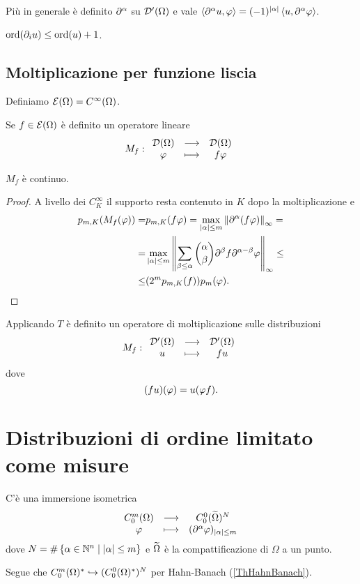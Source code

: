 \begin{remark}
Pi\`u in generale \`e definito $\partial^\alpha$ su $\mathcal{D}'(\Omega)$ e vale $\left\langle {\partial^\alpha u,\varphi}\right\rangle=(-1)^{\left|{\alpha}\right|}\left\langle {u,\partial^\alpha\varphi}\right\rangle$.
\end{remark}



\begin{remark}
$\operatorname{ord}(\partial_i u)\leq\operatorname{ord}(u)+1$.
\end{remark}



\subsection{Moltiplicazione per funzione liscia}
\begin{notation}
Definiamo $\mathcal{E}(\Omega)=C^\infty(\Omega)$.
\end{notation}

\begin{remark}
Se $f\in \mathcal{E}(\Omega)$ \`e definito un operatore lineare
\[M_f:\begin{array}{ccc} {\mathcal{D}(\Omega)} & \longrightarrow & {\mathcal{D}(\Omega)}\\ {\varphi} & \longmapsto & {f\varphi} \end{array}\]
\end{remark}

\begin{remark}
$M_f$ \`e continuo.
\end{remark}
\begin{proof}
A livello dei $C^\infty_K$ il supporto resta contenuto in $K$ dopo la moltiplicazione e
\begin{align*}
    p_{m,K}(M_f(\varphi))=&p_{m,K}(f\varphi)=\max_{\left|{\alpha}\right|\leq m}\left\Vert{\partial^\alpha(f\varphi)}\right\Vert_\infty=\\
    =&\max_{\left|{\alpha}\right|\leq m}\left\Vert{\sum_{\beta\leq \alpha}\binom{\alpha}\beta\partial^\beta f\partial^{\alpha-\beta}\varphi}\right\Vert_\infty\leq\\
    \leq& (2^m p_{m,K}(f))p_m(\varphi).
\end{align*}
\end{proof}

\begin{remark}
Applicando $T$ \`e definito un operatore di moltiplicazione sulle distribuzioni
\[M_f:\begin{array}{ccc} {\mathcal{D}'(\Omega)} & \longrightarrow & {\mathcal{D}'(\Omega)}\\ {u} & \longmapsto & {fu} \end{array}\]
dove
\[(fu)(\varphi)=u(\varphi f).\]
\end{remark}




\section{Distribuzioni di ordine limitato come misure}
\begin{remark}
C'\`e una immersione isometrica
\[\begin{array}{ccc} {C^m_0(\Omega)} & \longrightarrow & {C^0_0(\widetilde{\Omega})^N}\\ {\varphi} & \longmapsto & {(\partial^\alpha\varphi)_{\left|{\alpha}\right|\leq m}} \end{array}\]
dove $N=\#\left\{{\alpha\in\mathbb{N}^n\mid \left|{\alpha}\right|\leq m}\right\}$ e $\widetilde{\Omega}$ \`e la compattificazione di $\Omega$ a un punto.
\smallskip

\noindent
Segue che $C^m_0(\Omega)^\ast\hookrightarrow (C^0_0(\Omega)^\ast)^N$ per Hahn-Banach (\ref{ThHahnBanach}).
\end{remark}

